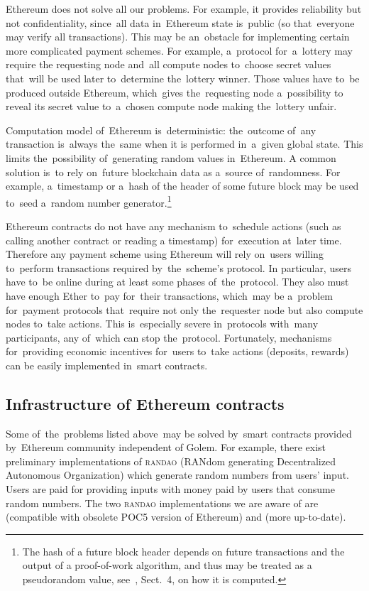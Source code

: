 \documentclass[a4paper]{article}
\newcommand{\randao}{\textsc{randao}}
\begin{document}
    Ethereum does not solve all our problems. For example, it provides reliability but not confidentiality, since~all
    data in~Ethereum state is~public (so that~everyone may verify all transactions). This may be an~obstacle for
    implementing certain more complicated payment schemes. For example, a~protocol for~a~lottery may require the
    requesting node and~all compute nodes to~choose secret values that~will be used later to~determine the~lottery
    winner. Those values have to~be produced outside Ethereum, which~gives the~requesting node a~possibility to
    reveal its secret value to~a~chosen compute node making the~lottery unfair.

    Computation model of~Ethereum is~deterministic: the~outcome of~any transaction is~always the~same when it is
    performed in~a~given global state. This limits the~possibility of~generating random values in~Ethereum.
    A common solution is~to rely on~future blockchain data as a~source of~randomness. For example, a~timestamp or
    a~hash of the header of some future block may be used to~seed a~random number generator.\footnote{The hash of a
      future block header depends on future transactions and the output of a proof-of-work algorithm,
      and thus may be treated as a pseudorandom value, see~\cite{WOOD}, Sect.~4, on how it is computed.}

    Ethereum contracts do not have any mechanism to~schedule actions (such as calling another contract or reading a
    timestamp) for~execution at~later time. Therefore any payment scheme using Ethereum will rely on~users willing
    to~perform transactions required by~the~scheme's protocol. In particular, users have to~be online during at
    least some phases of~the~protocol. They also must have enough Ether to~pay for~their transactions, which~may be
    a~problem for~payment protocols that~require not only the~requester node but also compute nodes to~take actions.
    This is~especially severe in~protocols with~many participants, any of~which can stop the~protocol.
    Fortunately, mechanisms for~providing economic incentives for~users to~take actions (deposits, rewards)
    can be easily implemented in~smart contracts.

    \subsection{Infrastructure of Ethereum contracts}
    
    Some of~the~problems listed above~may be solved by~smart contracts provided by~Ethereum community independent of
    Golem. For example, there exist preliminary implementations of \randao{} (RANdom generating Decentralized Autonomous
    Organization) which generate random numbers from users' input. Users are paid for providing inputs with
    money paid by users that consume random numbers. The two \randao{} implementations we are aware of are \cite{RANDAO}
    (compatible with obsolete POC5 version of Ethereum) and \cite{RANDAO2} (more up-to-date).
\end{document}

